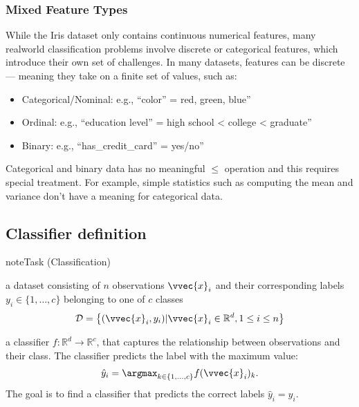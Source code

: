 \documentclass[letterpaper,10pt,english]{jupyterBook}
\begin{document}
\subsubsection{Mixed Feature Types}
\label{\detokenize{classification_problem:mixed-feature-types}}
\sphinxAtStartPar
While the Iris dataset only contains continuous numerical features, many real\sphinxhyphen{}world classification problems involve discrete or categorical features, which introduce their own set of challenges.
In many datasets, features can be discrete — meaning they take on a finite set of values, such as:
\begin{itemize}
\item {} 
\sphinxAtStartPar
Categorical/Nominal: e.g., “color” = red, green, blue”

\item {} 
\sphinxAtStartPar
Ordinal: e.g., “education level” = high school < college < graduate”

\item {} 
\sphinxAtStartPar
Binary: e.g., “has\_credit\_card” = yes/no”

\end{itemize}

\sphinxAtStartPar
Categorical and binary data has no meaningful \(\leq\) operation and this requires special treatment. For example, simple statistics such as computing the mean and variance don’t have a meaning for categorical data.


\subsection{Classifier definition}
\label{\detokenize{classification_problem:classifier-definition}}
\begin{sphinxadmonition}{note}{Task (Classification)}

\sphinxAtStartPar
{} a dataset consisting of \(n\) observations \(\vvec{x}_i\) and their corresponding labels \(y_i\in\{1,\ldots, c\}\) belonging to one of \(c\) classes
\begin{equation*}
\begin{split}\mathcal{D}=\left\{(\vvec{x}_{i},y_i)\vert \vvec{x}_{i}\in\mathbb{R}^{d}, 1\leq i \leq n\right\}\end{split}
\end{equation*}

\sphinxAtStartPar
{} a classifier \(f:\mathbb{R}^ d\rightarrow \mathbb{R}^c\), that captures the relationship between observations and their class. The classifier predicts the label with the maximum value:\begin{equation*}
\begin{split}\hat{y}_i = \argmax_{k\in\{1,\ldots,c\}}f(\vvec{x}_{i})_k.\end{split}
\end{equation*}
The goal is to find a classifier that predicts the correct labels \(\hat{y}_i = y_i\).
\end{sphinxadmonition}
\end{document}
